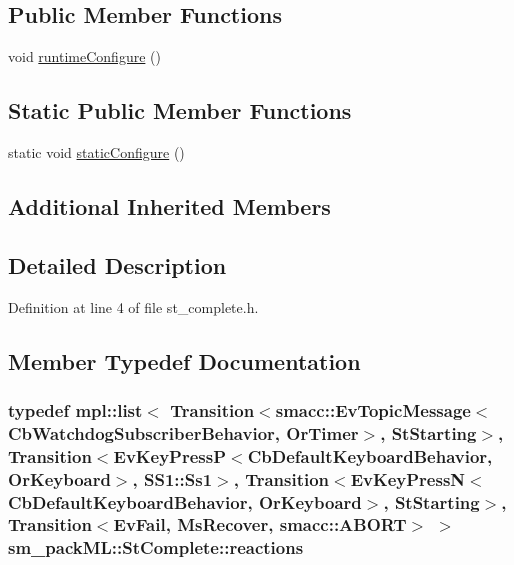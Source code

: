 \subsection*{Public Member Functions}
\begin{DoxyCompactItemize}
\item 
void \hyperlink{structsm__packML_1_1StComplete_aa499430406fce4eac712ca5a47f28027}{runtime\+Configure} ()
\end{DoxyCompactItemize}
\subsection*{Static Public Member Functions}
\begin{DoxyCompactItemize}
\item 
static void \hyperlink{structsm__packML_1_1StComplete_a800b03ade903de294f66fc2874bba57b}{static\+Configure} ()
\end{DoxyCompactItemize}
\subsection*{Additional Inherited Members}


\subsection{Detailed Description}


Definition at line 4 of file st\+\_\+complete.\+h.



\subsection{Member Typedef Documentation}
\subsubsection[{\texorpdfstring{reactions}{reactions}}]{\setlength{\rightskip}{0pt plus 5cm}typedef mpl\+::list$<$ Transition$<${\bf smacc\+::\+Ev\+Topic\+Message}$<${\bf Cb\+Watchdog\+Subscriber\+Behavior}, {\bf Or\+Timer}$>$, {\bf St\+Starting}$>$, Transition$<$Ev\+Key\+PressP$<$Cb\+Default\+Keyboard\+Behavior, {\bf Or\+Keyboard}$>$, {\bf S\+S1\+::\+Ss1}$>$, Transition$<$Ev\+Key\+PressN$<$Cb\+Default\+Keyboard\+Behavior, {\bf Or\+Keyboard}$>$, {\bf St\+Starting}$>$, Transition$<${\bf Ev\+Fail}, {\bf Ms\+Recover}, {\bf smacc\+::\+A\+B\+O\+RT}$>$ $>$ {\bf sm\+\_\+pack\+M\+L\+::\+St\+Complete\+::reactions}}\hypertarget{structsm__packML_1_1StComplete_a02c15e2bdde49cb38eeba92881d47074}{}\label{structsm__packML_1_1StComplete_a02c15e2bdde49cb38eeba92881d47074}


